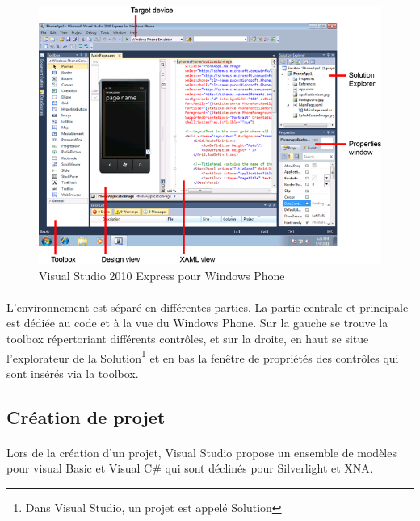 \documentclass[twoside,UTF8]{EPURapport}
\begin{document}
	\begin{figure}[H]
		\center
		\includegraphics[scale=0.6]{images/visualstudioview.png}
		\caption{Visual Studio 2010 Express pour Windows Phone}
	\end{figure}

\paragraph{}
L'environnement est séparé en différentes parties. La partie centrale et principale est dédiée au code et à la vue du Windows Phone. Sur la gauche se trouve la toolbox répertoriant différents contrôles, et sur la droite, en haut se situe l'explorateur de la Solution\footnote{Dans Visual Studio, un projet est appelé Solution} et en bas la fenêtre de propriétés des contrôles qui sont insérés via la toolbox. 

		\subsection{Création de projet}
\paragraph{}
Lors de la création d'un projet, Visual Studio propose un ensemble de modèles pour visual Basic et Visual C$\#$ qui sont déclinés pour Silverlight et XNA.
\end{document}
